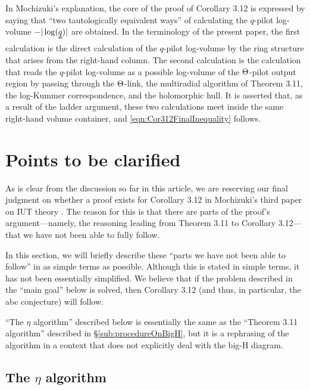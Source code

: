 \documentclass[12pt, reqno, a4paper]{amsart}
\begin{document}
\begin{rem}\label{rem:twoTautologicalWays}
In Mochizuki's explanation, the core of the proof of Corollary 3.12 is expressed by saying that ``two tautologically equivalent ways'' of calculating the \(q\)-pilot log-volume \(-|\log(\uuqq)|\) are obtained.
In the terminology of the present paper, the first calculation is the direct calculation of the \(q\)-pilot log-volume by the ring structure that arises from the right-hand column.  
The second calculation is the calculation that reads the \(q\)-pilot log-volume as a possible log-volume of the \(\Th\)-pilot output region by passing through the \(\Th\)-link, the multiradial algorithm of Theorem 3.11, the log-Kummer correspondence, and the holomorphic hull.
It is asserted that, as a result of the ladder argument, these two calculations meet inside the same right-hand volume container, and \eqref{eqn:Cor312FinalInequality} follows.
\end{rem}


\setcounter{equation}{0}
\section{Points to be clarified}\label{sec:pointsToClarify}
As is clear from the discussion so far in this article, we are reserving our final judgment on whether a proof exists for Corollary 3.12 in Mochizuki's third paper on IUT theory \cite{MR4225475}.
The reason for this is that there are parts of the proof's argument—namely, the reasoning leading from Theorem 3.11 to Corollary 3.12—that we have not been able to fully follow.

In this section, we will briefly describe these ``parts we have not been able to follow'' in as simple terms as possible.
Although this is stated in simple terms, it has not been essentially simplified.
We believe that if the problem described in the ``main goal'' below is solved, then Corollary 3.12 (and thus, in particular, the abc conjecture) will follow.

``The $\eta$ algorithm'' described below is essentially the same as the ``Theorem 3.11 algorithm'' described in \S\ref{sub:procedureOnBigH}, but it is a rephrasing of the algorithm in a context that does not explicitly deal with the big-H diagram.


\subsection{The $\eta$ algorithm}\label{sub:etaAlgorithm}
\end{document}
